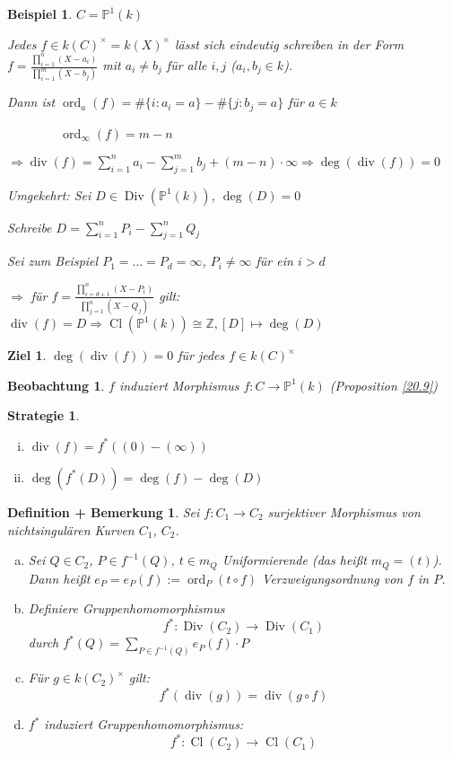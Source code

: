 \documentclass[a4paper, 12pt, numbers=noendperiod, chapterprefix=true]{scrbook}
\theoremstyle{break}
\newtheorem{DefBem}[Def]{Definition + Bemerkung}
\newtheorem{Bsp}[Def]{Beispiel}
\theoremstyle{nonumberbreak}
\newtheorem{Beo}{Beobachtung}
\newtheorem{Ziel}{Ziel}
\newtheorem{Strat}{Strategie}
\theoremstyle{nonumberplain}
\newcommand{\Sum}{\sum\limits}
\DeclareMathOperator{\Cl}{Cl}
\DeclareMathOperator{\Div}{Div}
\DeclareMathOperator{\Ddiv}{div}
\DeclareMathOperator{\ord}{ord}
\newcommand{\Z}{\mathbb{Z}}
\newcommand{\IP}{\mathbb{P}}%
\newcommand{\X}{\times}
\begin{document}
\begin{Bsp}
$C=\IP^1(k)$

Jedes $f\in k(C)^\X=k(X)^\X$ l\"asst sich eindeutig schreiben in der Form $f=\frac{\prod\limits_{i=1}^n(X-a_i)}{\prod\limits_{i=1}^m(X-b_j)}$ mit $a_i\neq b_j$ f\"ur alle $i,j$ ($a_i,b_j\in k$).

Dann ist $\ord_a(f)=\#\{i:a_i=a\}-\#\{j:b_j=a\}$ f\"ur $a\in k$

\textcolor{white}{Dann ist} $\ord_\infty(f)=m-n$

$\Rightarrow \Ddiv(f)=\Sum_{i=1}^na_i-\Sum_{j=1}^mb_j+(m-n)\cdot\infty \Rightarrow \deg(\Ddiv(f))=0$

\emph{Umgekehrt}: Sei $D\in \Div(\IP^1(k))$, $\deg(D)=0$

Schreibe $D=\Sum_{i=1}^nP_i-\Sum_{j=1}^{n}Q_j$

Sei zum Beispiel $P_1=\ldots =P_d=\infty$, $P_i\ne\infty$ f\"ur ein $i>d$

$\Rightarrow$ f\"ur $f=\frac{\prod\limits_{i=d+1}^n(X-P_i)}{\prod\limits_{j=1}^{n}(X-Q_j)}$ gilt: $\Ddiv(f)=D \Rightarrow \Cl(\IP^1(k))\cong\Z, [D]\mapsto\deg(D)$
\end{Bsp}

\begin{Ziel}
$\deg(\Ddiv(f))=0$ f\"ur jedes $f\in k(C)^\X$
\end{Ziel}

\begin{Beo}
$f$ induziert Morphismus $f:C\to\IP^1(k)$ (Proposition \ref{20.9})
\end{Beo}

\begin{Strat}\begin{enumerate}[i)]
\item
	$\Ddiv(f)=f^*((0)-(\infty))$
\item
	$\deg(f^*(D))=\deg(f)-\deg(D)$
\end{enumerate}\end{Strat}

\begin{DefBem}
Sei $f:C_1\to C_2$ surjektiver Morphismus von nichtsingul\"aren Kurven $C_1$, $C_2$.\begin{enumerate}[a)]
\item
	Sei $Q\in C_2$, $P\in f^{-1}(Q)$, $t\in m_Q$ Uniformierende (das hei\ss t $m_Q=(t)$). Dann hei\ss t $e_P=e_P(f):=\ord_P(t\circ f)$ Verzweigungsordnung von $f$ in $P$.
\item
	Definiere Gruppenhomomorphismus	
		\[f^*: \Div(C_2) \to \Div(C_1) \]
	durch $f^*(Q)=\Sum_{P\in f^{-1}(Q)}e_P(f)\cdot P$
\item
	F\"ur $g\in k(C_2)^\X$ gilt:
		\[ f^*(\Ddiv(g))=\Ddiv(g\circ f) \]
\item
	$f^*$ induziert Gruppenhomomorphismus:
		\[ f^*: \Cl(C_2) \to \Cl(C_1) \]
\end{enumerate}\end{DefBem}
\end{document}
